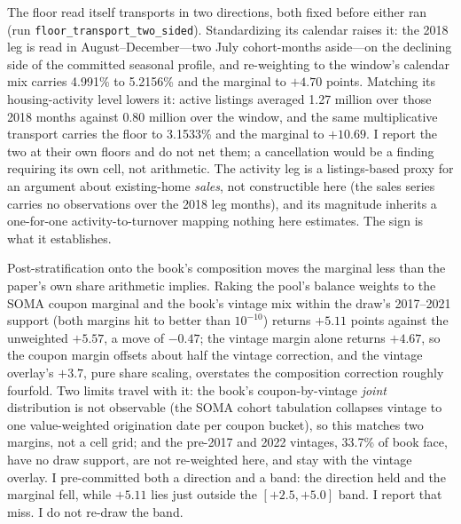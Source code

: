 The floor read itself transports in two directions, both fixed before either ran (run \texttt{floor\_transport\_two\_sided}). Standardizing its calendar raises it: the 2018 leg is read in August--December---two July cohort-months aside---on the declining side of the committed seasonal profile, and re-weighting to the window's calendar mix carries 4.991\% to 5.2156\% and the marginal to $+4.70$ points. Matching its housing-activity level lowers it: active listings averaged 1.27 million over those 2018 months against 0.80 million over the window, and the same multiplicative transport carries the floor to 3.1533\% and the marginal to $+10.69$. I report the two at their own floors and do not net them; a cancellation would be a finding requiring its own cell, not arithmetic. The activity leg is a listings-based proxy for an argument about existing-home \emph{sales}, not constructible here (the sales series carries no observations over the 2018 leg months), and its magnitude inherits a one-for-one activity-to-turnover mapping nothing here estimates. The sign is what it establishes.

Post-stratification onto the book's composition moves the marginal less than the paper's own share arithmetic implies. Raking the pool's balance weights to the SOMA coupon marginal and the book's vintage mix within the draw's 2017--2021 support (both margins hit to better than $10^{-10}$) returns $+5.11$ points against the unweighted $+5.57$, a move of $-0.47$; the vintage margin alone returns $+4.67$, so the coupon margin offsets about half the vintage correction, and the vintage overlay's $+3.7$, pure share scaling, overstates the composition correction roughly fourfold. Two limits travel with it: the book's coupon-by-vintage \emph{joint} distribution is not observable (the SOMA cohort tabulation collapses vintage to one value-weighted origination date per coupon bucket), so this matches two margins, not a cell grid; and the pre-2017 and 2022 vintages, 33.7\% of book face, have no draw support, are not re-weighted here, and stay with the vintage overlay. I pre-committed both a direction and a band: the direction held and the marginal fell, while $+5.11$ lies just outside the $[+2.5, +5.0]$ band. I report that miss. I do not re-draw the band.

